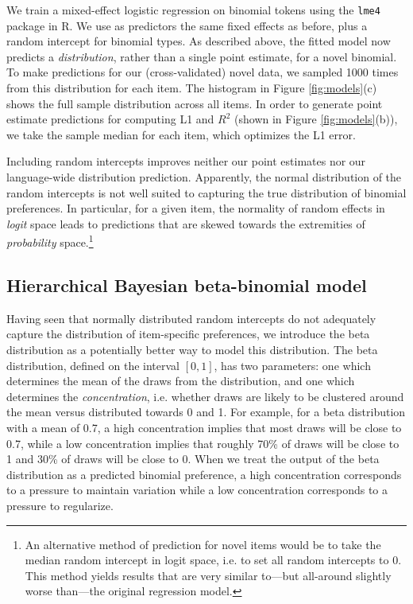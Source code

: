 \documentclass[10pt,letterpaper]{article}
\begin{document}
We train a mixed-effect logistic regression on binomial tokens using the {\tt lme4} package in R. We use as predictors the same fixed effects as before, plus a random intercept for binomial types. As described above, the fitted model now predicts a \emph{distribution}, rather than a single point estimate, for a novel binomial. To make predictions for our (cross-validated) novel data, we sampled 1000 times from this distribution for each item. The histogram in Figure \ref{fig:models}(c) shows the full sample distribution across all items. In order to generate point estimate predictions for computing L1 and $R^{2}$ (shown in Figure \ref{fig:models}(b)), we take the sample median for each item, which optimizes the L1 error.

Including random intercepts improves neither our point estimates nor our language-wide distribution prediction. Apparently, the normal distribution of the random intercepts is not well suited to capturing the true distribution of binomial preferences. In particular, for a given item, the normality of random effects in \emph{logit} space leads to predictions that are skewed towards the extremities of \emph{probability} space.\footnote{An alternative method of prediction for novel items would be to take the median random intercept in logit space, i.e. to set all random intercepts to 0. This method yields results that are very similar to---but all-around slightly worse than---the original regression model.}


%

\subsection{Hierarchical Bayesian beta-binomial model}
Having seen that normally distributed random intercepts do not adequately capture the distribution of item-specific preferences, we introduce the beta distribution as a potentially better way to model this distribution. The beta distribution, defined on the interval $[0,1]$, has two parameters: one which determines the mean of the draws from the distribution, and one which determines the \emph{concentration}, i.e. whether draws are likely to be clustered around the mean versus distributed towards 0 and 1. For example, for a beta distribution with a mean of 0.7, a high concentration implies that most draws will be close to 0.7, while a low concentration implies that roughly 70\% of draws will be close to 1 and 30\% of draws will be close to 0. When we treat the output of the beta distribution as a predicted binomial preference, a high concentration corresponds to a pressure to maintain variation while a low concentration corresponds to a pressure to regularize.
\end{document}
